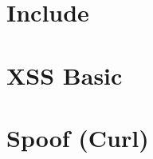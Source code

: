 





\clearpage


\clearpage

\section{Include}


\clearpage


\section{XSS Basic}


\clearpage





\section{Spoof (Curl)}

